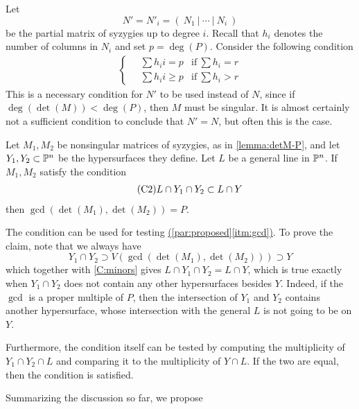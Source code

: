 \documentclass[fleqn,reqno]{amsart}
\renewcommand{\itmref}[2]{{\normalfont\hyperref[#1]{(\ref*{#2}\ref*{#1})}}}
\begin{document}
\begin{paragraf}
Let
\[
	N'=N'_i=(~N_1~|~\cdots~|~N_i~)
\]
be the partial matrix of syzygies up to degree $i$.
Recall that $h_i$ denotes the number of columns in $N_i$
and set $p=\deg(P)$.
Consider the following condition
\begin{align}
	\label{C:matrix}
	\tag{C1}
	\begin{cases}
		\quad\sum h_ii=p &\text{if}~\sum h_i=r\\
		\quad\sum h_ii\geq p&\text{if}~\sum h_i>r
	\end{cases}
\end{align}
This is a necessary condition for $N'$ to be used instead of $N$,
since if $\deg(\det(M))<\deg(P)$, then $M$ must be singular.
It is almost certainly not a sufficient condition to conclude that $N'=N$,
but often this is the case.
\end{paragraf}

\begin{paragraf}
\label{par:intersect-general-line}
Let $M_1,M_2$ be nonsingular matrices of syzygies, as in \eqref{lemma:detM-P},
and let $Y_1,Y_2\subset\mathbb{P}^n$ be the hypersurfaces they define.
Let $L$ be a general line in $\mathbb{P}^n$.
If $M_1,M_2$ satisfy the condition
\begin{align}
	\label{C:minors}
	\tag{C2}
	L\cap Y_1\cap Y_2\subset L\cap Y
\end{align}
then $\gcd(\det(M_1),\det(M_2))=P$.

The condition can be used for testing \itmref{itm:gcd}{par:proposed}.
To prove the claim, note that we always have
\[
	Y_1\cap Y_2\supset V(\gcd(\det(M_1),\det(M_2)))\supset Y
\]
which together with \eqref{C:minors} gives $L\cap Y_1\cap Y_2=L\cap Y$,
which is true exactly when $Y_1\cap Y_2$ does not contain any other hypersurfaces besides $Y$.
Indeed, if the $\gcd$ is a proper multiple of $P$, then the intersection of
$Y_1$ and $Y_2$ contains another hypersurface, whose intersection with the general $L$
is not going to be on $Y$.

Furthermore, the condition itself can be tested by computing the multiplicity
of $Y_1\cap Y_2\cap L$ and comparing it to the multiplicity of $Y\cap L$.
If the two are equal, then the condition is satisfied.
\end{paragraf}

\begin{paragraf*}
Summarizing the discussion so far, we propose
\end{paragraf*}
\end{document}
